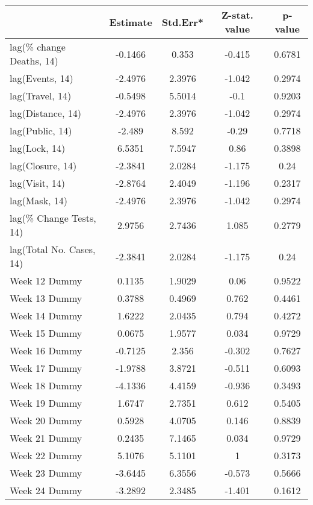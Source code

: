 \begingroup\tiny
\begin{longtable}{lcccc}
  \toprule
 & Estimate & Std.Err* & Z-stat. value & p-value \\ 
  \midrule
lag(\% change Deaths, 14) & -0.1466 & 0.353 & -0.415 & 0.6781 \\ 
  lag(Events, 14) & -2.4976 & 2.3976 & -1.042 & 0.2974 \\ 
  lag(Travel, 14) & -0.5498 & 5.5014 & -0.1 & 0.9203 \\ 
  lag(Distance, 14) & -2.4976 & 2.3976 & -1.042 & 0.2974 \\ 
  lag(Public, 14) & -2.489 & 8.592 & -0.29 & 0.7718 \\ 
  lag(Lock, 14) & 6.5351 & 7.5947 & 0.86 & 0.3898 \\ 
  lag(Closure, 14) & -2.3841 & 2.0284 & -1.175 & 0.24 \\ 
  lag(Visit, 14) & -2.8764 & 2.4049 & -1.196 & 0.2317 \\ 
  lag(Mask, 14) & -2.4976 & 2.3976 & -1.042 & 0.2974 \\ 
  lag(\% Change Tests, 14) & 2.9756 & 2.7436 & 1.085 & 0.2779 \\ 
  lag(Total No. Cases, 14) & -2.3841 & 2.0284 & -1.175 & 0.24 \\ 
  Week 12 Dummy & 0.1135 & 1.9029 & 0.06 & 0.9522 \\ 
  Week 13 Dummy & 0.3788 & 0.4969 & 0.762 & 0.4461 \\ 
  Week 14 Dummy & 1.6222 & 2.0435 & 0.794 & 0.4272 \\ 
  Week 15 Dummy & 0.0675 & 1.9577 & 0.034 & 0.9729 \\ 
  Week 16 Dummy & -0.7125 & 2.356 & -0.302 & 0.7627 \\ 
  Week 17 Dummy & -1.9788 & 3.8721 & -0.511 & 0.6093 \\ 
  Week 18 Dummy & -4.1336 & 4.4159 & -0.936 & 0.3493 \\ 
  Week 19 Dummy & 1.6747 & 2.7351 & 0.612 & 0.5405 \\ 
  Week 20 Dummy & 0.5928 & 4.0705 & 0.146 & 0.8839 \\ 
  Week 21 Dummy & 0.2435 & 7.1465 & 0.034 & 0.9729 \\ 
  Week 22 Dummy & 5.1076 & 5.1101 & 1 & 0.3173 \\ 
  Week 23 Dummy & -3.6445 & 6.3556 & -0.573 & 0.5666 \\ 
  Week 24 Dummy & -3.2892 & 2.3485 & -1.401 & 0.1612 \\ 

\end{longtable}
